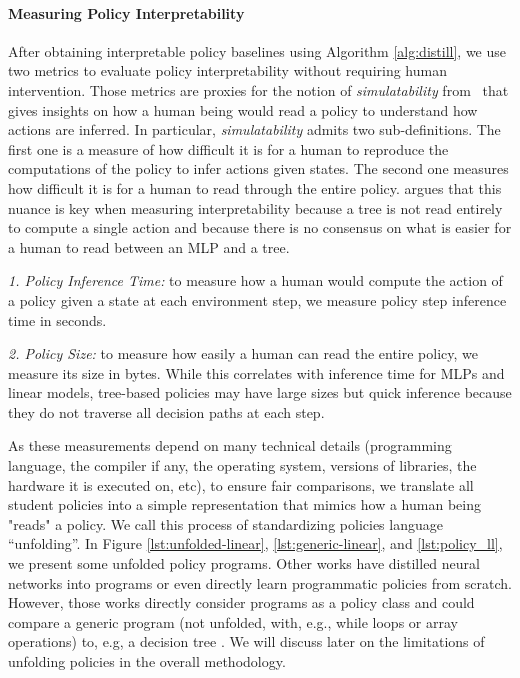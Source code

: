 \paragraph{Measuring Policy Interpretability}
After obtaining interpretable policy baselines using Algorithm \ref{alg:distill}, we use two metrics to evaluate policy interpretability without requiring human intervention. Those metrics are proxies for the notion of \textit{simulatability} from~\cite{mythos} that gives insights on how a human being would read a policy to understand how actions are inferred. In particular, \textit{simulatability} admits two sub-definitions. The first one is a measure of how difficult it is for a human to reproduce the computations of the policy to infer actions given states. The second one measures how difficult it is for a human to read through the entire policy. \cite{mythos} argues that this nuance is key when measuring interpretability because a tree is not read entirely to compute a single action and because there is no consensus on what is easier for a human to read between an MLP and a tree. 

\textit{1. Policy Inference Time:} to measure how a human would compute the action of a policy given a state at each environment step, we measure policy step inference time in seconds.

\textit{2. Policy Size:} to measure how easily a human can read the entire policy, we measure its size in bytes. While this correlates with inference time for MLPs and linear models, tree-based policies may have large sizes but quick inference because they do not traverse all decision paths at each step.

As these measurements depend on many technical details (programming language, the compiler if any, the operating system, versions of libraries, the hardware it is executed on, etc), to ensure fair comparisons, we translate all student policies into a simple representation that mimics how a human being "reads" a policy. We call this process of standardizing policies language ``unfolding''.
In Figure \ref{lst:unfolded-linear}, \ref{lst:generic-linear}, and \ref{lst:policy_ll}, we present some unfolded policy programs. Other works have distilled neural networks into programs \cite{PIRL} or even directly learn programmatic policies \cite{pirl2} from scratch. However, those works directly consider programs as a policy class and could compare a generic program (not unfolded, with, e.g., while loops or array operations) to, e.g, a decision tree \cite{leap}. We will discuss later on the limitations of unfolding policies in the overall methodology.

